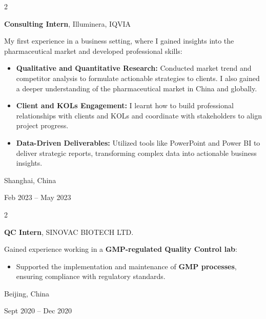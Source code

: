 \documentclass[10pt, letterpaper]{article}
\newenvironment{highlights}{
    \begin{itemize}[
        topsep=0.10 cm,
        parsep=0.10 cm,
        partopsep=0pt,
        itemsep=0pt,
        leftmargin=0.4 cm + 10pt
    ]
}{
    \end{itemize}
} %
\newenvironment{twocolentry}[2][]{
    \onecolentry
    \def\secondColumn{#2}
    \setcolumnwidth{\fill, 4.5 cm}
    \begin{paracol}{2}
}{
    \switchcolumn \raggedleft \secondColumn
    \end{paracol}
    \endonecolentry
} %
\begin{document}
        \vspace{0.3 cm}

        \begin{twocolentry}{
    Shanghai, China

    Feb 2023 – May 2023
}
    \textbf{Consulting Intern}, Illuminera, IQVIA

    \vspace{0.1cm}
    
    My first experience in a business setting, where I gained insights into the pharmaceutical market and developed professional skills:
    

    \begin{highlights}
        \item \textbf{Qualitative and Quantitative Research:} Conducted market trend and competitor analysis to formulate actionable strategies to clients. I also gained a deeper understanding of the pharmaceutical market in China and globally.

        \vspace{0.1cm}
        
        \item \textbf{Client and KOLs Engagement:} I learnt how to build professional relationships with clients and KOLs and coordinate with stakeholders to align project progress.

        \vspace{0.1cm}
        
        \item \textbf{Data-Driven Deliverables:} Utilized tools like PowerPoint and Power BI to deliver strategic reports, transforming complex data into actionable business insights.
    \end{highlights}
\end{twocolentry}

        \vspace{0.3 cm}

        \begin{twocolentry}{
    Beijing, China

    Sept 2020 – Dec 2020
}
    \textbf{QC Intern}, SINOVAC BIOTECH LTD.

    \vspace{0.1cm}
    
    Gained experience working in a \textbf{GMP-regulated Quality Control lab}:

    \begin{highlights}
        \item Supported the implementation and maintenance of \textbf{GMP processes}, ensuring compliance with regulatory standards.
    \end{highlights}
\end{twocolentry}
\end{document}
